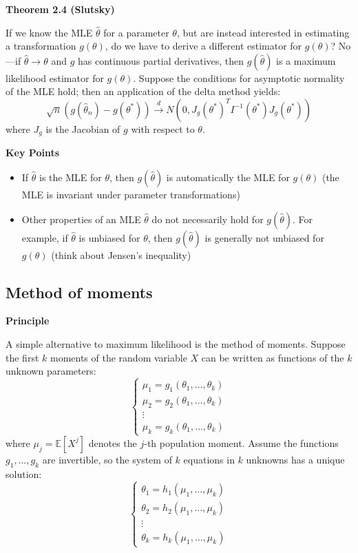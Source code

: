 \documentclass[12pt,a4paper]{article}
\begin{document}
\vspace{0.5em}

\textbf{Theorem 2.4 (Slutsky)}

If we know the MLE $\hat{\theta}$ for a parameter $\theta$, but are instead interested in estimating a transformation $g(\theta)$, do we have to derive a different estimator for $g(\theta)$? No—if $\hat{\theta} \to \theta$ and $g$ has continuous partial derivatives, then $g(\hat{\theta})$ is a maximum likelihood estimator for $g(\theta)$. Suppose the conditions for asymptotic normality of the MLE hold; then an application of the delta method yields:
\[
\sqrt{n}(g(\hat{\theta}_n) - g(\theta^*)) \xrightarrow{d} N(0, J_g(\theta^*)^T I^{-1}(\theta^*) J_g(\theta^*))
\]
where $J_g$ is the Jacobian of $g$ with respect to $\theta$.

\textbf{Key Points}

\begin{itemize}
    \item If $\hat{\theta}$ is the MLE for $\theta$, then $g(\hat{\theta})$ is automatically the MLE for $g(\theta)$ (the MLE is invariant under parameter transformations)
    \item Other properties of an MLE $\hat{\theta}$ do not necessarily hold for $g(\hat{\theta})$. For example, if $\hat{\theta}$ is unbiased for $\theta$, then $g(\hat{\theta})$ is generally not unbiased for $g(\theta)$ (think about Jensen's inequality)
\end{itemize}

\subsection{Method of moments}

\textbf{Principle}

A simple alternative to maximum likelihood is the method of moments. Suppose the first $k$ moments of the random variable $X$ can be written as functions of the $k$ unknown parameters:
\[
\begin{cases}
\mu_1 = g_1(\theta_1, \ldots, \theta_k) \\
\mu_2 = g_2(\theta_1, \ldots, \theta_k) \\
\vdots \\
\mu_k = g_k(\theta_1, \ldots, \theta_k)
\end{cases}
\]
where $\mu_j = \mathbb{E}[X^j]$ denotes the $j$-th population moment. Assume the functions $g_1, \ldots, g_k$ are invertible, so the system of $k$ equations in $k$ unknowns has a unique solution:
\[
\begin{cases}
\theta_1 = h_1(\mu_1, \ldots, \mu_k) \\
\theta_2 = h_2(\mu_1, \ldots, \mu_k) \\
\vdots \\
\theta_k = h_k(\mu_1, \ldots, \mu_k)
\end{cases}
\]
\end{document}
